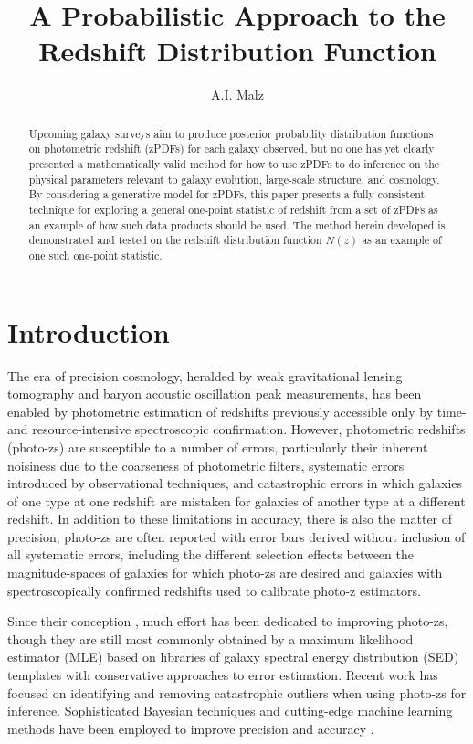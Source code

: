 \documentclass[preprint]{aastex}
\begin{document}
\title{A Probabilistic Approach to the Redshift Distribution Function}

\author{A.I. Malz}

\begin{abstract}
Upcoming galaxy surveys aim to produce posterior probability distribution functions on photometric redshift (zPDFs) for each galaxy observed, but no one has yet clearly presented a mathematically valid method for how to use zPDFs to do inference on the physical parameters relevant to galaxy evolution, large-scale structure, and cosmology.  By considering a generative model for zPDFs, this paper presents a fully consistent technique for exploring a general one-point statistic of redshift from a set of zPDFs as an example of how such data products should be used.  The method herein developed is demonstrated and tested on the redshift distribution function $N(z)$ as an example of one such one-point statistic.
\end{abstract}


\clearpage
\section{Introduction}
\label{sec:intro}

The era of precision cosmology, heralded by weak gravitational lensing tomography and baryon acoustic oscillation peak measurements, has been enabled by photometric estimation of redshifts previously accessible only by time- and resource-intensive spectroscopic confirmation.  However, photometric redshifts (photo-zs) are susceptible to a number of errors, particularly their inherent noisiness due to the coarseness of photometric filters, systematic errors introduced by observational techniques, and catastrophic errors in which galaxies of one type at one redshift are mistaken for galaxies of another type at a different redshift.  In addition to these limitations in accuracy, there is also the matter of precision; photo-zs are often reported with error bars derived without inclusion of all systematic errors, including the different selection effects between the magnitude-spaces of galaxies for which photo-zs are desired and galaxies with spectroscopically confirmed redshifts used to calibrate photo-z estimators.

Since their conception \citep{bau62}, much effort has been dedicated to improving photo-zs, though they are still most commonly obtained by a maximum likelihood estimator (MLE) based on libraries of galaxy spectral energy distribution (SED) templates with conservative approaches to error estimation.  Recent work has focused on identifying and removing catastrophic outliers when using photo-zs for inference.  \citep{gor13}  Sophisticated Bayesian techniques and cutting-edge machine learning methods have been employed to improve precision \citep{car10} and accuracy \citep{sad15}. 
\end{document}
